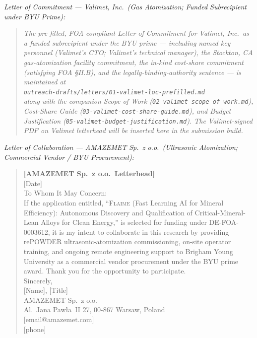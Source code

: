 \documentclass[11pt,letterpaper]{article}
\newcommand{\flaime}{\textsc{Flaime}}
\newcommand{\projecttitle}{\flaime{} (Fast Learning AI for Mineral
Efficiency): Autonomous Discovery and Qualification of
Critical-Mineral-Lean Alloys for Clean Energy}
\begin{document}
\clearpage
\textit{Letter of Commitment --- Valimet, Inc.\ (Gas Atomization; Funded
Subrecipient under BYU Prime):}

\begin{quote}\small
\textit{The pre-filled, FOA-compliant Letter of Commitment for Valimet,
Inc.\ as a funded subrecipient under the BYU prime --- including
named key personnel (Valimet's CTO; Valimet's technical manager),
the Stockton, CA gas-atomization facility commitment, the in-kind
cost-share commitment (satisfying FOA \S II.B), and the legally-binding-authority sentence
--- is maintained at\\
\quad\texttt{outreach-drafts/letters/01-valimet-loc-prefilled.md}\\
along with the companion Scope of Work
(\texttt{02-valimet-scope-of-work.md}), Cost-Share Guide
(\texttt{03-valimet-cost-share-guide.md}), and Budget Justification
(\texttt{05-valimet-budget-justification.md}). The Valimet-signed PDF on
Valimet letterhead will be inserted here in the submission build.}
\end{quote}

\clearpage
\textit{Letter of Collaboration --- AMAZEMET Sp.\ z o.o.\ (Ultrasonic
Atomization; Commercial Vendor / BYU Procurement):}

\begin{quote}\small
\textbf{{[}AMAZEMET Sp.\ z o.o.\ Letterhead{]}}\\[4pt]
{[}Date{]}\\[6pt]
To Whom It May Concern:\\[4pt]
If the application entitled, ``\projecttitle{},'' is selected for funding
under DE-FOA-0003612, it is my intent to collaborate in this research by
providing rePOWDER ultrasonic-atomization commissioning, on-site operator
training, and ongoing remote engineering support to Brigham Young
University as a commercial vendor procurement under the BYU prime award.
Thank you for the opportunity to participate.\\[12pt]
Sincerely,\\[4pt]
{[}Name{]}, {[}Title{]}\\
AMAZEMET Sp.\ z o.o.\\
Al.\ Jana Paw{\l}a~II 27, 00-867 Warsaw, Poland\\
{[}email@amazemet.com{]}\\
{[}phone{]}
\end{quote}

\newpage
\end{document}
